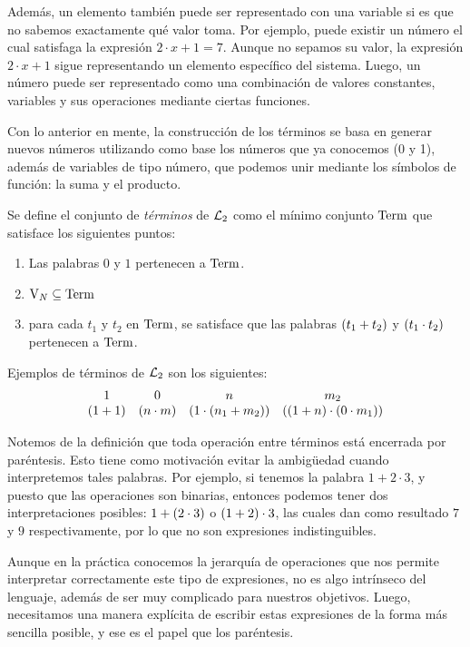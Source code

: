 Además, un elemento también puede ser representado con una variable si es que no sabemos exactamente qué valor toma. Por ejemplo, puede existir un número el cual satisfaga la expresión $2\cdot x + 1 = 7$. Aunque no sepamos su valor, la expresión $2\cdot x + 1$ sigue representando un elemento específico del sistema. Luego, un número puede ser representado como una combinación de valores constantes, variables y sus operaciones mediante ciertas funciones.

Con lo anterior en mente, la construcción de los términos se basa en generar nuevos números utilizando como base los números que ya conocemos (0 y 1), además de variables de tipo número, que podemos unir mediante los símbolos de función: la suma y el producto.

\begin{definition}[Términos]
	Se define el conjunto de \emph{términos} de $\ARITMETICA$ como el mínimo conjunto $\TERMINOS$ que satisface los siguientes puntos:

	\begin{enumerate}
		\item Las palabras $0$ y $1$ pertenecen a $\TERMINOS$.
		\item $\VARIABLES[N]\subseteq\TERMINOS$
		\item para cada $t_{1}$ y $t_{2}$ en $\TERMINOS$, se satisface que las palabras $\pa*{t_{1} + t_{2}}$ y $\pa*{t_{1}\cdot t_{2}}$ pertenecen a $\TERMINOS$.
	\end{enumerate}
\end{definition}

Ejemplos de términos de $\ARITMETICA$ son los siguientes:
\[
	\begin{array}{cccc}
		1 & 0 & n & m_{2}\\
		\pa*{1 + 1} &\pa*{n\cdot m} &\pa*{1\cdot\pa*{n_{1} + m_{2}}} &\pa*{\pa*{1 + n}\cdot\pa*{0\cdot m_{1}}}
	\end{array}
\]

Notemos de la definición que toda operación entre términos está encerrada por paréntesis. Esto tiene como motivación evitar la ambigüedad cuando interpretemos tales palabras. Por ejemplo, si tenemos la palabra $1 + 2\cdot 3$, y puesto que las operaciones son binarias, entonces podemos tener dos interpretaciones posibles: $1 +\pa*{2\cdot 3}$ o $\pa*{1 + 2}\cdot 3$, las cuales dan como resultado $7$ y $9$ respectivamente, por lo que no son expresiones indistinguibles. 

Aunque en la práctica conocemos la jerarquía de operaciones que nos permite interpretar correctamente este tipo de expresiones, no es algo intrínseco del lenguaje, además de ser muy complicado para nuestros objetivos. Luego, necesitamos una manera explícita de escribir estas expresiones de la forma más sencilla posible, y ese es el papel que los paréntesis.

